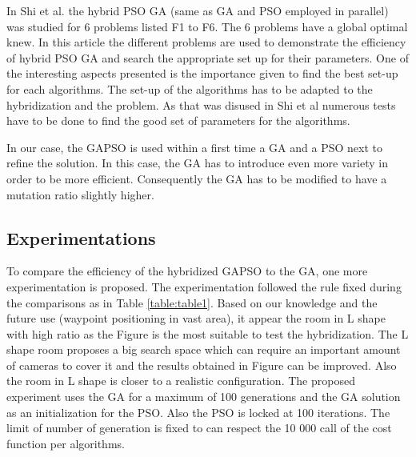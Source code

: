 In Shi et al. \cite{77*shi2005} the hybrid PSO GA (same as GA and PSO employed in parallel) was studied for 6  problems listed F1 to F6. The 6 problems have a global optimal knew. In this article \cite{77*shi2005} the different problems are used to demonstrate the efficiency of hybrid PSO GA and search the appropriate set up for their parameters. One of the interesting aspects presented is the importance given to find the best set-up for each algorithms. 
The set-up of the algorithms has to be adapted to the hybridization and the problem. As that was disused in Shi et al \cite{77*shi2005} numerous tests have to be done to find the good set of parameters for the algorithms.

 In our case, the GAPSO is used within a first time a GA and a PSO next to refine the solution. In this case, the GA has to introduce even more variety in order to be more efficient. Consequently the GA has to be modified to have a mutation ratio slightly higher.   



\subsection{Experimentations }
To compare the efficiency of the hybridized GAPSO to the GA, one more experimentation is proposed.
The experimentation followed the rule fixed during the comparisons as in Table \ref{table:table1}. %
Based on our knowledge and the future use (waypoint positioning in vast area), it appear the room in L shape with high ratio as the Figure  is the most suitable to test the hybridization.  %
The L shape room proposes a big search space which can require an important amount of cameras to cover it and the results obtained in Figure  can be improved. Also the room in L shape  is closer to a realistic configuration.  %
The proposed experiment uses the GA for a maximum of 100 generations and the GA solution as an initialization for the PSO. Also the PSO is locked at 100 iterations.  The limit of  number of generation is fixed to can respect the 10 000 call  of the cost function per algorithms.%


